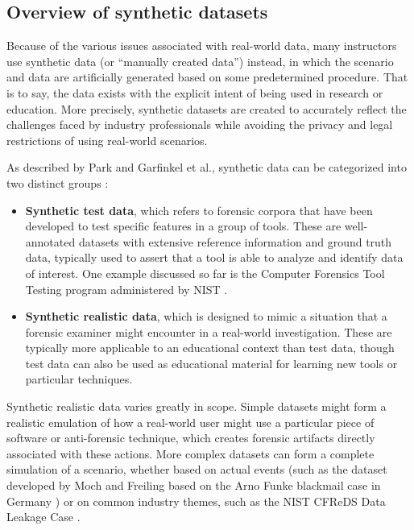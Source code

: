 \documentclass[letterpaper,12pt]{report}
\def\tightlist{}
\begin{document}
\subsection{Overview of synthetic
datasets}\label{overview-of-synthetic-datasets}

Because of the various issues associated with real-world data, many
instructors use synthetic data (or ``manually created data'') instead,
in which the scenario and data are artificially generated based on some
predetermined procedure. That is to say, the data exists with the
explicit intent of being used in research or education. More precisely,
synthetic datasets are created to accurately reflect the challenges
faced by industry professionals while avoiding the privacy and legal
restrictions of using real-world scenarios.

As described by Park and Garfinkel et al., synthetic data can be
categorized into two distinct groups
\cite{garfinkelBringingScienceDigital2009,parkTREDEVMPOPCultivating2018}:

\begin{itemize}
\tightlist
\item
  \textbf{Synthetic test data}, which refers to forensic corpora that
  have been developed to test specific features in a group of tools.
  These are well-annotated datasets with extensive reference information
  and ground truth data, typically used to assert that a tool is able to
  analyze and identify data of interest. One example discussed so far is
  the Computer Forensics Tool Testing program administered by NIST
  \cite{nationalinstituteofstandardsandtechnologyComputerForensicsTool2017}.
\item
  \textbf{Synthetic realistic data}, which is designed to mimic a
  situation that a forensic examiner might encounter in a real-world
  investigation. These are typically more applicable to an educational
  context than test data, though test data can also be used as
  educational material for learning new tools or particular techniques.
\end{itemize}

Synthetic realistic data varies greatly in scope. Simple datasets might
form a realistic emulation of how a real-world user might use a
particular piece of software or anti-forensic technique, which creates
forensic artifacts directly associated with these actions. More complex
datasets can form a complete simulation of a scenario, whether based on
actual events (such as the dataset developed by Moch and Freiling based
on the Arno Funke blackmail case in Germany
\cite{mochForensicImageGenerator2009}) or on common industry themes,
such as the NIST CFReDS Data Leakage Case
\cite{nationalinstituteofstandardsandtechnologyCFReDSDataLeakage}.
\end{document}
